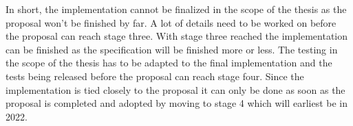 In short, the implementation cannot be finalized in the scope of the thesis as the proposal won't be finished by far. A lot of details need to be worked on before the proposal can reach stage three. With stage three reached the implementation can be finished as the specification will be finished more or less. The testing in the scope of the thesis has to be adapted to the final implementation and the tests being released before the proposal can reach stage four. Since the implementation is tied closely to the proposal it can only be done as soon as the proposal is completed and adopted by moving to stage 4 which will earliest be in 2022.


